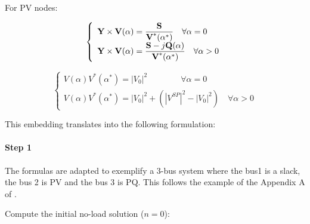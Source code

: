 \documentclass[nols,a4paper,twoside,notoc,fleqn]{tufte-book}
\begin{document}
For PV nodes:

\begin{equation}
\left\{
\begin{array}{ll}
\mathlarger{\textbf{Y} \times \textbf{V}(\alpha) = \frac{ \textbf{S}}{\textbf{V}^*(\alpha^*)}} \quad \forall \alpha=0\\
\mathlarger{\textbf{Y} \times \textbf{V}(\alpha) = \frac{ \textbf{S} - j \textbf{Q}(\alpha)}{\textbf{V}^*(\alpha^*)}} \quad \forall \alpha>0
\end{array}
\right.
\end{equation}

\begin{equation}
\left\{
\begin{array}{ll}
V(\alpha)V^*(\alpha^*) = |V_0|^2\quad \quad \quad \quad \forall \alpha=0\\
V(\alpha)V^*(\alpha^*) = |V_0|^2 + (|V^{SP}|^2-|V_0|^2) \quad \forall \alpha>0
\end{array}
\right.
\end{equation}




This embedding translates into the following formulation:

\paragraph{Step 1}

The formulas are adapted to exemplify a 3-bus system where the bus1 is a slack, the bus 2 is PV and the bus 3 is PQ. This follows the example of the Appendix A of \cite{liu2017online}.

\vspace{1cm}

Compute the initial no-load solution ($n=0$):
\end{document}
